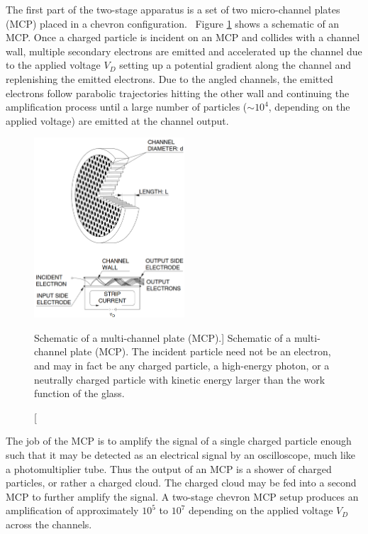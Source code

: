 The first part of the two-stage apparatus is a set of two micro-channel plates (MCP) placed in a chevron configuration.\footnotemark~ Figure \ref{fig:MCP} shows a schematic of an MCP. Once a charged particle is incident on an MCP and collides with a channel wall, multiple secondary electrons are emitted and accelerated up the channel due to the applied voltage $V_D$ setting up a potential gradient along the channel and replenishing the emitted electrons. Due to the angled channels, the emitted electrons follow parabolic trajectories hitting the other wall and continuing the amplification process until a large number of particles ($\sim10^4$, depending on the applied voltage) are emitted at the channel output.


\begin{figure}
  \centering
  \includegraphics[width=0.50\textwidth]{gfx/MCP}
  \caption
  [Schematic of a multi-channel plate (MCP).]
  {Schematic of a multi-channel plate (MCP). The incident particle need not be an electron, and may in fact be any charged particle, a high-energy photon, or a neutrally charged particle with kinetic energy larger than the work function of the glass.}
  \label{fig:MCP}
\end{figure}

The job of the MCP is to amplify the signal of a single charged particle enough such that it may be detected as an electrical signal by an oscilloscope, much like a photomultiplier tube. Thus the output of an MCP is a shower of charged particles, or rather a charged cloud. The charged cloud may be fed into a second MCP to further amplify the signal. A two-stage chevron MCP setup produces an amplification of approximately $10^5$ to $10^7$ depending on the applied voltage $V_D$ across the channels.

